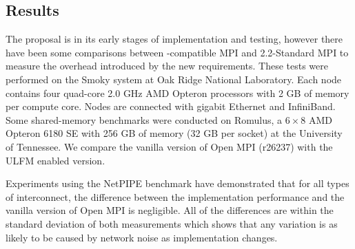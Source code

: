 \subsection{\ulfm Results}\label{subsect:ulfm-results}

The \ulfm proposal is in its early stages of implementation and testing, however
there have been some comparisons between \ulfm-compatible MPI and 2.2-Standard
MPI to measure the overhead introduced by the new requirements. These tests were
performed on the Smoky system at Oak Ridge National Laboratory. Each node
contains four quad-core 2.0 GHz AMD Opteron processors with 2 GB of memory per
compute core. Nodes are connected with gigabit Ethernet and InfiniBand. Some
shared-memory benchmarks were conducted on Romulus, a $6\times8$ AMD Opteron
6180 SE with 256 GB of memory (32 GB per socket) at the University of Tennessee.
We compare the vanilla version of Open MPI (r26237) with the ULFM enabled
version. 


Experiments using the NetPIPE benchmark have demonstrated that for all types of
interconnect, the difference between the \ulfm implementation performance and
the vanilla version of Open MPI is negligible. All of the differences are within
the standard deviation of both measurements which shows that any variation is as
likely to be caused by network noise as implementation changes.

